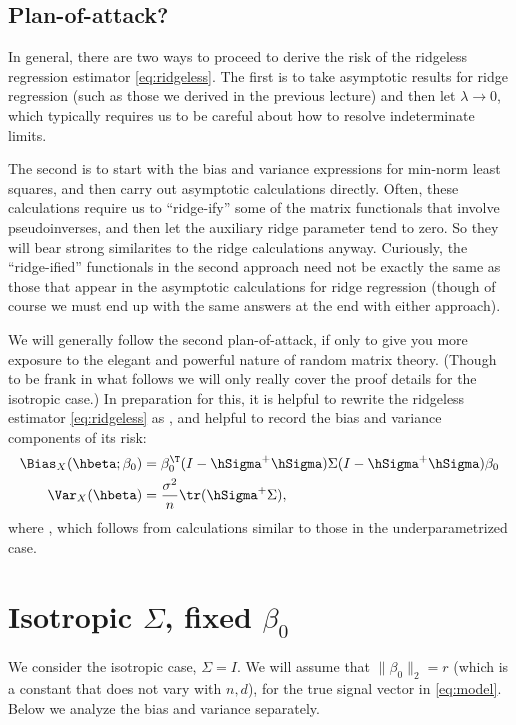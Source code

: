 \documentclass{article}
\begin{document}
\subsection{Plan-of-attack?}

In general, there are two ways to proceed to derive the risk of the ridgeless
regression estimator \eqref{eq:ridgeless}. The first is to take asymptotic
results for ridge regression (such as those we derived in the previous lecture)
and then let $\lambda \to 0$, which typically requires us to be careful about
how to resolve indeterminate limits. 

The second is to start with the bias and variance expressions for min-norm 
least squares, and then carry out asymptotic calculations directly. Often, these
calculations require us to ``ridge-ify'' some of the matrix functionals
that involve pseudoinverses, and then let the auxiliary ridge parameter tend to
zero. So they will bear strong similarites to the ridge calculations
anyway. Curiously, the ``ridge-ified'' functionals in the second approach need
not be exactly the same as those that appear in the asymptotic calculations for 
ridge regression (though of course we must end up with the same answers at the
end with either approach).    

We will generally follow the second plan-of-attack, if only to give you more
exposure to the elegant and powerful nature of random matrix theory. (Though to
be frank in what follows we will only really cover the proof details for the 
isotropic case.) In preparation for this, it is helpful to rewrite the ridgeless
estimator  \eqref{eq:ridgeless} as , and
helpful to record the bias and variance components of its risk:  
\begin{align}
\label{eq:ridgeless_bias}
\Bias_X(\hbeta; \beta_0) &= \beta_0^\T (I - \hSigma^+ \hSigma) \Sigma 
  (I - \hSigma^+ \hSigma) \beta_0 \\  
\label{eq:ridgeless_var}
\Var_X(\hbeta) &= \frac{\sigma^2}{n} \tr (\hSigma^+ \Sigma),
\end{align}
where , which follows from calculations similar to
those in the underparametrized case.      

\section{Isotropic $\Sigma$, fixed $\beta_0$}

We consider the isotropic case, $\Sigma = I$.  We will assume that $\|\beta_0\|_2
= r$ (which is a constant that does not vary with $n,d$), for the true signal
vector in \eqref{eq:model}. Below we analyze the bias and variance separately.
\end{document}
